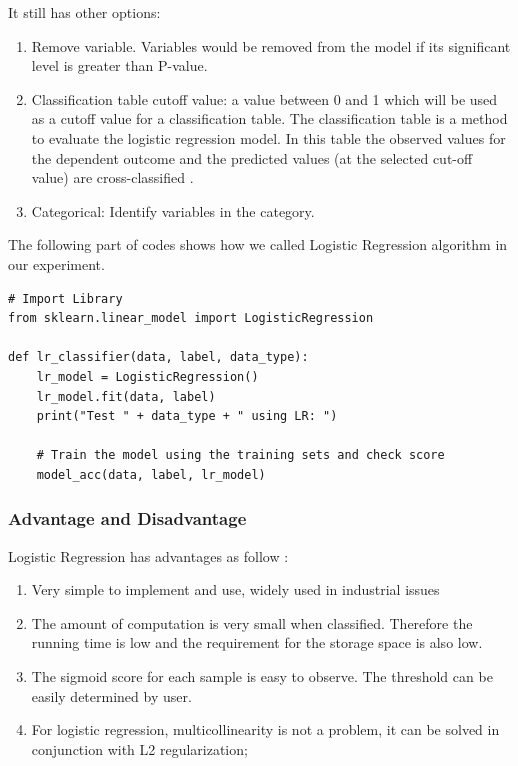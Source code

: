 \documentclass[sigconf]{acmart}
\begin{document}
It still has other options:
\begin{enumerate}
    \item Remove variable. Variables would be removed from the model if its significant level is greater than P-value.
    \item Classification table cutoff value: a value between 0 and 1 which will be used as a cutoff value for a classification table. The classification table is a method to evaluate the logistic regression model. In this table the observed values for the dependent outcome and the predicted values (at the selected cut-off value) are cross-classified \cite{lr.form}.
    \item Categorical: Identify variables in the category.
\end{enumerate}

The following part of codes shows how we called Logistic Regression algorithm in our experiment.
\begin{lstlisting}
# Import Library
from sklearn.linear_model import LogisticRegression

def lr_classifier(data, label, data_type):
    lr_model = LogisticRegression()
    lr_model.fit(data, label)
    print("Test " + data_type + " using LR: ")
    
    # Train the model using the training sets and check score
    model_acc(data, label, lr_model)
\end{lstlisting}

\subsubsection{Advantage and Disadvantage}

Logistic Regression has advantages as follow \cite{LR}:
\begin{enumerate}
    \item Very simple to implement and use, widely used in industrial issues
    \item The amount of computation is very small when classified. Therefore the running time is low and the requirement for the storage space is also low.
    \item The sigmoid score for each sample is easy to observe. The threshold can be easily determined by user.
    \item For logistic regression, multicollinearity is not a problem, it can be solved in conjunction with L2 regularization;
\end{enumerate}
\end{document}
